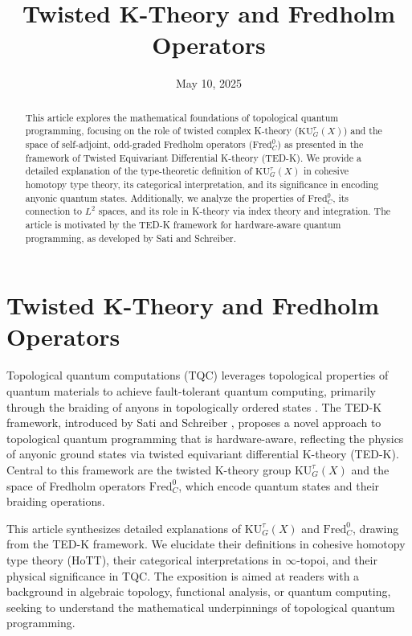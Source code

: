 \documentclass{article}
\title{Twisted K-Theory and Fredholm Operators}
\author{}
\date{May 10, 2025}
\theoremstyle{definition}
\begin{document}
\maketitle

\begin{abstract}
This article explores the mathematical foundations of topological quantum programming, focusing on the role of twisted complex K-theory (\(\mathrm{KU}^\tau_G(X)\)) and the space of self-adjoint, odd-graded Fredholm operators (\(\text{Fred}^0_C\)) as presented in the framework of Twisted Equivariant Differential K-theory (TED-K). We provide a detailed explanation of the type-theoretic definition of \(\mathrm{KU}^\tau_G(X)\) in cohesive homotopy type theory, its categorical interpretation, and its significance in encoding anyonic quantum states. Additionally, we analyze the properties of \(\text{Fred}^0_C\), its connection to \(L^2\) spaces, and its role in K-theory via index theory and integration. The article is motivated by the TED-K framework for hardware-aware quantum programming, as developed by Sati and Schreiber.
\end{abstract}

\tableofcontents

\section{Twisted K-Theory and Fredholm Operators}

Topological quantum computations (TQC) leverages topological
properties of quantum materials to achieve fault-tolerant
quantum computing, primarily through the braiding of anyons
in topologically ordered states \cite{Nayak2008}.
The TED-K framework, introduced by Sati and Schreiber \cite{SatiSchreiber2022},
proposes a novel approach to topological quantum programming that is hardware-aware,
reflecting the physics of anyonic ground states via twisted equivariant differential
K-theory (TED-K). Central to this framework are the twisted
K-theory group \(\mathrm{KU}^\tau_G(X)\) and the space of
Fredholm operators \(\text{Fred}^0_C\), which encode quantum
states and their braiding operations.

This article synthesizes detailed explanations of \(\mathrm{KU}^\tau_G(X)\) and \(\text{Fred}^0_C\), drawing from the TED-K framework. We elucidate their definitions in cohesive homotopy type theory (HoTT), their categorical interpretations in \(\infty\)-topoi, and their physical significance in TQC. The exposition is aimed at readers with a background in algebraic topology, functional analysis, or quantum computing, seeking to understand the mathematical underpinnings of topological quantum programming.
\end{document}
